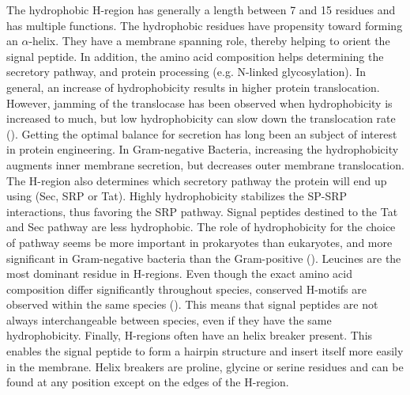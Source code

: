 The hydrophobic H-region has generally a length between 7 and 15 residues and has multiple functions.
The hydrophobic residues have propensity toward forming an $\alpha$-helix.
They have a membrane spanning role,
thereby helping to orient the signal peptide.
In addition, the amino acid composition helps determining the secretory pathway, 
and protein processing (e.g. N-linked glycosylation).
In general, an increase of hydrophobicity results in higher protein translocation.
However, jamming of the translocase has been observed when hydrophobicity is increased to much,
but low hydrophobicity can slow down the translocation rate
(\cite{mordkovich2015}).
Getting the optimal balance for secretion has long been an subject of interest in protein engineering.
In Gram-negative Bacteria,
increasing the hydrophobicity augments inner membrane secretion,
but decreases outer membrane translocation.
The H-region also determines which secretory pathway the protein will end up using (Sec, SRP or Tat).
Highly hydrophobicity stabilizes the SP-SRP interactions, thus favoring the SRP pathway.
Signal peptides destined to the Tat and Sec pathway are less hydrophobic.
The role of hydrophobicity for the choice of pathway seems be more important in prokaryotes than eukaryotes,
and more significant in Gram-negative bacteria than the Gram-positive
(\cite{owji2018}).
Leucines are the most dominant residue in H-regions.
Even though the exact amino acid composition differ significantly throughout species,
conserved H-motifs are observed within the same species
(\cite{duffy2010}).
This means that signal peptides are not always interchangeable between species,
even if they have the same hydrophobicity.
Finally, H-regions often have an helix breaker present.
This enables the signal peptide to form a hairpin structure and insert itself more easily in the membrane.
Helix breakers are proline, glycine or serine residues and can be found at any position except on the edges of the H-region.
